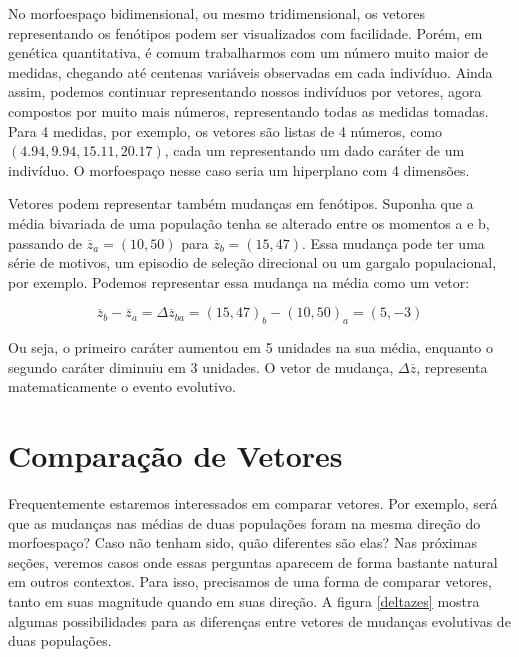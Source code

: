 \documentclass[portuges,]{tufte-handout}
\begin{document}
No morfoespaço bidimensional, ou mesmo tridimensional, os vetores
representando os fenótipos podem ser visualizados com facilidade. Porém,
em genética quantitativa, é comum trabalharmos com um número muito maior
de medidas, chegando até centenas variáveis observadas em cada
indivíduo. Ainda assim, podemos continuar representando nossos
indivíduos por vetores, agora compostos por muito mais números,
representando todas as medidas tomadas. Para 4 medidas, por exemplo, os
vetores são listas de 4 números, como \((4.94, 9.94, 15.11, 20.17)\),
cada um representando um dado caráter de um indivíduo. O morfoespaço
nesse caso seria um hiperplano com 4 dimensões.

Vetores podem representar também mudanças em fenótipos. Suponha que a
média bivariada de uma população tenha se alterado entre os momentos a e
b, passando de \(\overline z_a=(10, 50)\) para
\(\overline z_b=(15, 47)\). Essa mudança pode ter uma série de motivos,
um episodio de seleção direcional ou um gargalo populacional, por
exemplo. Podemos representar essa mudança na média como um vetor:

\[
\overline z_b - \overline z_a = \Delta \overline z_{ba} = (15, 47)_b - (10, 50)_a = (5, -3)
\]

Ou seja, o primeiro caráter aumentou em 5 unidades na sua média,
enquanto o segundo caráter diminuiu em 3 unidades. O vetor de mudança,
\(\Delta \overline z\), representa matematicamente o evento evolutivo.

\section{Comparação de Vetores}\label{comparauxe7uxe3o-de-vetores}

Frequentemente estaremos interessados em comparar vetores. Por exemplo,
será que as mudanças nas médias de duas populações foram na mesma
direção do morfoespaço? Caso não tenham sido, quão diferentes são elas?
Nas próximas seções, veremos casos onde essas perguntas aparecem de
forma bastante natural em outros contextos. Para isso, precisamos de uma
forma de comparar vetores, tanto em suas magnitude quando em suas
direção. A figura \ref{deltazes} mostra algumas possibilidades para as
diferenças entre vetores de mudanças evolutivas de duas populações.
\end{document}
